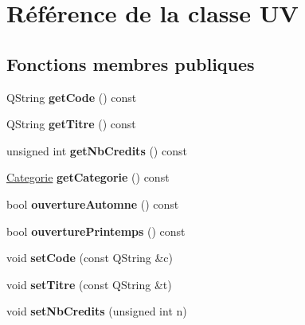 \hypertarget{class_u_v}{\section{Référence de la classe U\+V}
\label{class_u_v}
}
\subsection*{Fonctions membres publiques}
\begin{DoxyCompactItemize}
\item 
\hypertarget{class_u_v_a4d5fe39505b3e474b41013dda0d2047a}{Q\+String {\bfseries get\+Code} () const }\label{class_u_v_a4d5fe39505b3e474b41013dda0d2047a}

\item 
\hypertarget{class_u_v_afa7f5a8c7ea21bedcd00af1a1ff48221}{Q\+String {\bfseries get\+Titre} () const }\label{class_u_v_afa7f5a8c7ea21bedcd00af1a1ff48221}

\item 
\hypertarget{class_u_v_a68c71544276792a5cf8de0b146830eaa}{unsigned int {\bfseries get\+Nb\+Credits} () const }\label{class_u_v_a68c71544276792a5cf8de0b146830eaa}

\item 
\hypertarget{class_u_v_ab57e190abc1bce79c34a0ad457a920a6}{\hyperlink{class_categorie}{Categorie} {\bfseries get\+Categorie} () const }\label{class_u_v_ab57e190abc1bce79c34a0ad457a920a6}

\item 
\hypertarget{class_u_v_a29423fb485037fc882b8b29cae033c9a}{bool {\bfseries ouverture\+Automne} () const }\label{class_u_v_a29423fb485037fc882b8b29cae033c9a}

\item 
\hypertarget{class_u_v_adca45078b74fdc3c09621a521756e8af}{bool {\bfseries ouverture\+Printemps} () const }\label{class_u_v_adca45078b74fdc3c09621a521756e8af}

\item 
\hypertarget{class_u_v_a9c3b73077819774423559abd838e410b}{void {\bfseries set\+Code} (const Q\+String \&c)}\label{class_u_v_a9c3b73077819774423559abd838e410b}

\item 
\hypertarget{class_u_v_a52c66013e137689883802465596bb688}{void {\bfseries set\+Titre} (const Q\+String \&t)}\label{class_u_v_a52c66013e137689883802465596bb688}

\item 
\hypertarget{class_u_v_afe8639c00d1314a9f329385835771eef}{void {\bfseries set\+Nb\+Credits} (unsigned int n)}\label{class_u_v_afe8639c00d1314a9f329385835771eef}


\end{DoxyCompactItemize}
